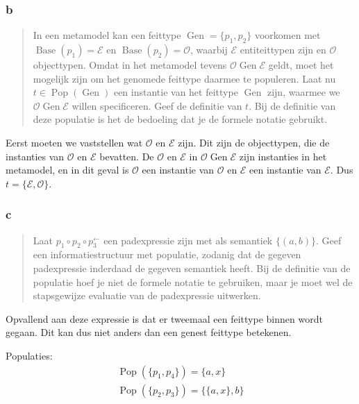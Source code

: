 \documentclass[10pt]{article}
\newcommand{\Gen}{\ensuremath{\operatorname{Gen}}}
\newcommand{\Base}{\ensuremath{\operatorname{Base}}}
\newcommand{\Pop}{\ensuremath{\operatorname{Pop}}}
\newcommand{\E}{\ensuremath{\mathcal{E}}}
\renewcommand{\O}{\ensuremath{\mathcal{O}}}
\begin{document}
\subsubsection{b}

\begin{quote}

  In een metamodel kan een feittype $\Gen = \{p_1, p_2\}$ voorkomen met
  $\Base(p_1) = \E$ en $\Base(p_2) = \O$, waarbij $\E$ entiteittypen zijn en
  $\O$ objecttypen. Omdat in het metamodel tevens $\O \Gen \E$ geldt, moet het
  mogelijk zijn om het genomede feittype daarmee te populeren. Laat nu $t \in
  \Pop(\Gen)$ een instantie van het feittype $\Gen$ zijn, waarmee we $\O \Gen
  \E$ willen specificeren. Geef de definitie van $t$. Bij de definitie van deze
  populatie is het de bedoeling dat je de formele notatie gebruikt.
  \cite{tentamen2011}

\end{quote}

Eerst moeten we vaststellen wat $\O$ en $\E$ zijn. Dit zijn de objecttypen, die
de instanties van $\O$ en $\E$ bevatten. De $\O$ en $\E$ in $\O \Gen \E$ zijn
instanties in het metamodel, en in dit geval is $\O$ een instantie van $\O$ en
$\E$ een instantie van $\E$. Dus $t = \{\E, \O\}$.

\subsubsection{c}

\begin{quote}
  
Laat $p_1 \circ p_2 \circ p_3^\leftarrow$ een padexpressie zijn met als
semantiek $\{(a,b)\}$. Geef een informatiestructuur met populatie, zodanig dat
de gegeven padexpressie inderdaad de gegeven semantiek heeft. Bij de definitie
van de populatie hoef je niet de formele notatie te gebruiken, maar je moet wel
de stapsgewijze evaluatie van de padexpressie uitwerken. \cite{tentamen2011}

\end{quote}

Opvallend aan deze expressie is dat er tweemaal een feittype binnen wordt
gegaan. Dit kan dus niet anders dan een genest feittype betekenen. 

Populaties: 
\begin{align*}
  \Pop(\{p_1, p_4\}) = \{ a , x \} \\
  \Pop(\{p_2, p_3\}) = \{ \{a,x\}, b\} \\
\end{align*}
\end{document}
